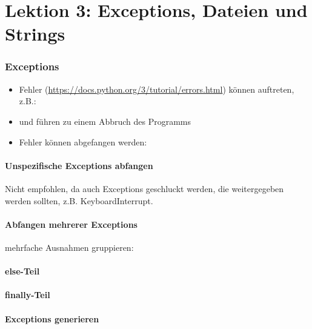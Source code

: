 \part{Lektion 3: Exceptions, Dateien und Strings}
\section{Exceptions}
\begin{itemize}
	\item Fehler (\url{https://docs.python.org/3/tutorial/errors.html}) können auftreten, z.B.:
	
	\item und führen zu einem Abbruch des Programms
	\item Fehler können abgefangen werden:
	
\end{itemize}

\subsection{Unspezifische Exceptions abfangen}
Nicht empfohlen, da auch Exceptions geschluckt werden, die weitergegeben werden sollten, z.B. KeyboardInterrupt.\\


\subsection{Abfangen mehrerer Exceptions}

mehrfache Ausnahmen gruppieren:\\


\subsection{else-Teil}


\subsection{finally-Teil}


\subsection{Exceptions generieren}


